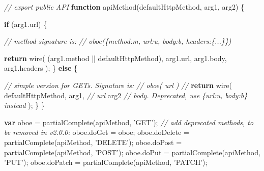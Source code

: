 \documentclass[12pt, ]{article}
\newenvironment{Shaded}{}{}
\newcommand{\KeywordTok}[1]{\textcolor[rgb]{0.00,0.44,0.13}{\textbf{{#1}}}}
\newcommand{\StringTok}[1]{\textcolor[rgb]{0.25,0.44,0.63}{{#1}}}
\newcommand{\CommentTok}[1]{\textcolor[rgb]{0.38,0.63,0.69}{\textit{{#1}}}}
\newcommand{\OtherTok}[1]{\textcolor[rgb]{0.00,0.44,0.13}{{#1}}}
\newcommand{\FunctionTok}[1]{\textcolor[rgb]{0.02,0.16,0.49}{{#1}}}
\newcommand{\NormalTok}[1]{{#1}}
\begin{document}
\begin{Shaded}
\begin{Highlighting}[]
\CommentTok{// export public API}
\KeywordTok{function} \FunctionTok{apiMethod}\NormalTok{(defaultHttpMethod, arg1, arg2) \{}

   \KeywordTok{if} \NormalTok{(}\OtherTok{arg1}\NormalTok{.}\FunctionTok{url}\NormalTok{) \{}

      \CommentTok{// method signature is:}
      \CommentTok{//    oboe(\{method:m, url:u, body:b, headers:\{...\}\})}

      \KeywordTok{return} \FunctionTok{wire}\NormalTok{(}
         \NormalTok{(}\OtherTok{arg1}\NormalTok{.}\FunctionTok{method} \NormalTok{|| defaultHttpMethod),}
         \OtherTok{arg1}\NormalTok{.}\FunctionTok{url}\NormalTok{,}
         \OtherTok{arg1}\NormalTok{.}\FunctionTok{body}\NormalTok{,}
         \OtherTok{arg1}\NormalTok{.}\FunctionTok{headers}
      \NormalTok{);}
   \NormalTok{\} }\KeywordTok{else} \NormalTok{\{}

      \CommentTok{//  simple version for GETs. Signature is:}
      \CommentTok{//    oboe( url )            }
      \CommentTok{//                                }
      \KeywordTok{return} \FunctionTok{wire}\NormalTok{(}
         \NormalTok{defaultHttpMethod,}
         \NormalTok{arg1, }\CommentTok{// url}
         \NormalTok{arg2  }\CommentTok{// body. Deprecated, use \{url:u, body:b\} instead}
      \NormalTok{);}
   \NormalTok{\}}
\NormalTok{\}}

\KeywordTok{var} \NormalTok{oboe = }\FunctionTok{partialComplete}\NormalTok{(apiMethod, }\StringTok{'GET'}\NormalTok{);}
\CommentTok{// add deprecated methods, to be removed in v2.0.0:}
\OtherTok{oboe}\NormalTok{.}\FunctionTok{doGet}    \NormalTok{= oboe;}
\OtherTok{oboe}\NormalTok{.}\FunctionTok{doDelete} \NormalTok{= }\FunctionTok{partialComplete}\NormalTok{(apiMethod, }\StringTok{'DELETE'}\NormalTok{);}
\OtherTok{oboe}\NormalTok{.}\FunctionTok{doPost}   \NormalTok{= }\FunctionTok{partialComplete}\NormalTok{(apiMethod, }\StringTok{'POST'}\NormalTok{);}
\OtherTok{oboe}\NormalTok{.}\FunctionTok{doPut}    \NormalTok{= }\FunctionTok{partialComplete}\NormalTok{(apiMethod, }\StringTok{'PUT'}\NormalTok{);}
\OtherTok{oboe}\NormalTok{.}\FunctionTok{doPatch}  \NormalTok{= }\FunctionTok{partialComplete}\NormalTok{(apiMethod, }\StringTok{'PATCH'}\NormalTok{);}
\end{Highlighting}
\end{Shaded}

\pagebreak
\end{document}
